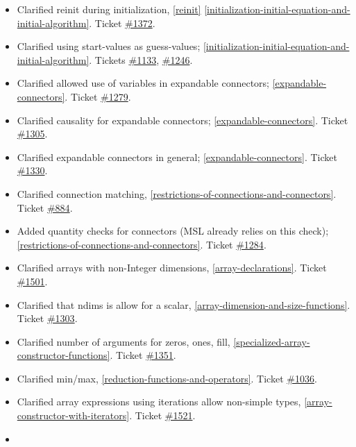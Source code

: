 \documentclass[10pt,a4paper]{report}
\begin{document}
\begin{itemize}
\item
  Clarified reinit during initialization, \ref{reinit} \ref{initialization-initial-equation-and-initial-algorithm}. Ticket
  \href{https://trac.modelica.org/Modelica/ticket/1372}{\#1372}.
\item
  Clarified using start-values as guess-values; \ref{initialization-initial-equation-and-initial-algorithm}. Tickets
  \href{https://trac.modelica.org/Modelica/ticket/1133}{\#1133},
  \href{https://trac.modelica.org/Modelica/ticket/1246}{\#1246}.
\item
  Clarified allowed use of variables in expandable connectors; \ref{expandable-connectors}. Ticket
  \href{https://trac.modelica.org/Modelica/ticket/1279}{\#1279}.
\item
  Clarified causality for expandable connectors; \ref{expandable-connectors}. Ticket
  \href{https://trac.modelica.org/Modelica/ticket/1305}{\#1305}.
\item
  Clarified expandable connectors in general; \ref{expandable-connectors}. Ticket
  \href{https://trac.modelica.org/Modelica/ticket/1330}{\#1330}.
\item
  Clarified connection matching, \ref{restrictions-of-connections-and-connectors}. Ticket
  \href{https://trac.modelica.org/Modelica/ticket/884}{\#884}.
\item
  Added quantity checks for connectors (MSL already relies on this
  check); \ref{restrictions-of-connections-and-connectors}. Ticket
  \href{https://trac.modelica.org/Modelica/ticket/1284}{\#1284}.
\item
  Clarified arrays with non-Integer dimensions, \ref{array-declarations}. Ticket
  \href{https://trac.modelica.org/Modelica/ticket/1501}{\#1501}.
\item
  Clarified that ndims is allow for a scalar, \ref{array-dimension-and-size-functions}. Ticket
  \href{https://trac.modelica.org/Modelica/ticket/1303}{\#1303}.
\item
  Clarified number of arguments for zeros, ones, fill, \ref{specialized-array-constructor-functions}.
  Ticket \href{https://trac.modelica.org/Modelica/ticket/1351}{\#1351}.
\item
  Clarified min/max, \ref{reduction-functions-and-operators}. Ticket
  \href{https://trac.modelica.org/Modelica/ticket/1036}{\#1036}.
\item
  Clarified array expressions using iterations allow non-simple types,
  \ref{array-constructor-with-iterators}. Ticket
  \href{https://trac.modelica.org/Modelica/ticket/1521}{\#1521}.
\item

\end{itemize}
\end{document}
